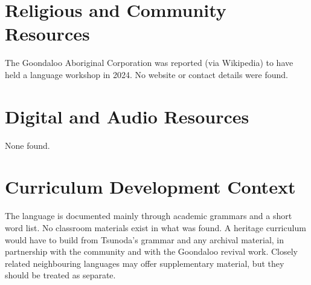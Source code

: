 \documentclass[12pt]{article}
\begin{document}
\section{Religious and Community Resources}
The Goondaloo Aboriginal Corporation was reported (via Wikipedia) to have held a language workshop in 2024. No website or contact details were found.

\section{Digital and Audio Resources}
None found.

\section{Curriculum Development Context}
The language is documented mainly through academic grammars and a short word list. No classroom materials exist in what was found. A heritage curriculum would have to build from Tsunoda's grammar and any archival material, in partnership with the community and with the Goondaloo revival work. Closely related neighbouring languages may offer supplementary material, but they should be treated as separate.
\end{document}
